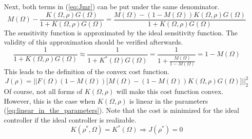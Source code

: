 Next, both terms in (\ref{eq:Jmr}) can be put under the same denominator.
\begin{equation*}
    M(\Omega)-\frac{K(\Omega,\rho) G(\Omega)}{1 + K(\Omega,\rho) G(\Omega)} = \frac{M(\Omega)-(1-M(\Omega))K(\Omega,\rho) G(\Omega)}{1 + K(\Omega,\rho) G(\Omega)}
\end{equation*}
The sensitivity function is approximated by the ideal sensitivity function. The validity of this approximation should be verified afterwards.
\begin{equation*}
    \frac{1}{1 + K(\Omega,\rho) G(\Omega)} \approx \frac{1}{1 + K^*(\Omega) G(\Omega)} = \frac{1}{1+\frac{M(\Omega)}{1-M(\Omega)}} = 1-M(\Omega)
\end{equation*}
This leads to the definition of the convex cost function.
\begin{equation}
\boxed{
    J(\rho) =  \Big|\Big|F(\Omega)(1-M(\Omega)) \Big[M(\Omega)-(1-M(\Omega))K(\Omega,\rho) G(\Omega)\Big]  \Big|\Big|_2^2 
    \label{eq:J}
}
\end{equation}
Of course, not all forms of $K(\Omega,\rho)$ will make this cost function convex. However, this is the case when $K(\Omega,\rho)$ is linear in the parameters (\ref{eq:linear_in_the_parameters}). Note that the cost is minimized for the ideal controller if the ideal controller is realizable.
\begin{equation*}
    K(\rho^*,\Omega) = K^*(\Omega) \Longrightarrow J(\rho^*) = 0
\end{equation*}


